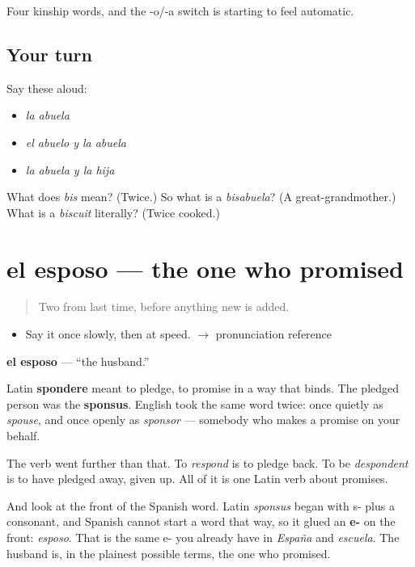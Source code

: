 \begin{grammarlens}[title={What you've built}]
Four kinship words, and the -o/-a switch is starting to feel automatic.
\end{grammarlens}

\subsection*{Your turn}
Say these aloud:

\begin{itemize}
\raggedright
  \item \emph{la abuela}
  \item \emph{el abuelo y la abuela}
  \item \emph{la abuela y la hija}
\end{itemize}

\begin{tcolorbox}[breakable,colback=teal!4,colframe=teal!35!black,title={Before you move on}]
What does \emph{bis} mean? (Twice.) So what is a \emph{bisabuela}? (A great-grandmother.) What is a \emph{biscuit} literally? (Twice cooked.)
\end{tcolorbox}
\section[el esposo]{el esposo --- the one who promised}

\label{lesson:ES-C306-esposo}



\begin{quote}
Two from last time, before anything new is added.
\end{quote}

\begin{sounds}
\begin{itemize}
\raggedright
  \item Say it once slowly, then at speed. $\to$ pronunciation reference
\end{itemize}
\end{sounds}

\begin{cousinweb}
\textbf{el esposo} --- \textquotedblleft{}the husband.\textquotedblright{}

Latin \textbf{spondere} meant to pledge, to promise in a way that binds. The pledged person was the \textbf{sponsus}. English took the same word twice: once quietly as \emph{spouse}, and once openly as \emph{sponsor} --- somebody who makes a promise on your behalf.

The verb went further than that. To \emph{respond} is to pledge back. To be \emph{despondent} is to have pledged away, given up. All of it is one Latin verb about promises.

And look at the front of the Spanish word. Latin \emph{sponsus} began with s- plus a consonant, and Spanish cannot start a word that way, so it glued an \textbf{e-} on the front: \emph{esposo}. That is the same e- you already have in \emph{España} and \emph{escuela}. The husband is, in the plainest possible terms, the one who promised.
\end{cousinweb}

